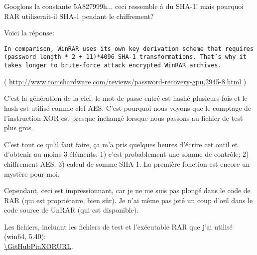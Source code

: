 Googlons la constante 5A827999h... ceci ressemble à du SHA-1! mais pourquoi RAR utiliserait-il
SHA-1 pendant le chiffrement?

Voici la réponse:

\begin{lstlisting}
In comparison, WinRAR uses its own key derivation scheme that requires (password length * 2 + 11)*4096 SHA-1 transformations. That’s why it takes longer to brute-force attack encrypted WinRAR archives.
\end{lstlisting}
( \url{http://www.tomshardware.com/reviews/password-recovery-gpu,2945-8.html} )

C'est la génération de la clef: le mot de passe entré est hashé plusieurs fois et
le hash est utilisé comme clef \ac{AES}.
C'est pourquoi nous voyons que le comptage de l'instruction XOR est presque inchangé
lorsque nous passons au fichier de test plus gros.

C'est tout ce qu'il faut faire, ça m'a pris quelques heures d'écrire cet outil et
d'obtenir au moins 3 éléments: 1) c'est probablement une somme de contrôle; 2) chiffrement
\ac{AES}; 3) calcul de somme SHA-1.
La première fonction est encore un mystère pour moi.

Cependant, ceci est impressionnant, car je ne me suis pas plongé dans le code de
RAR (qui est propriétaire, bien sûr). Je n'ai même pas jeté un coup d'\oe{}il dans
le code source de UnRAR (qui est disponible).

Les fichiers, incluant les fichiers de test et l'exécutable RAR que j'ai utilisé (win64, 5.40): \\
\url{\GitHubPinXORURL}.

